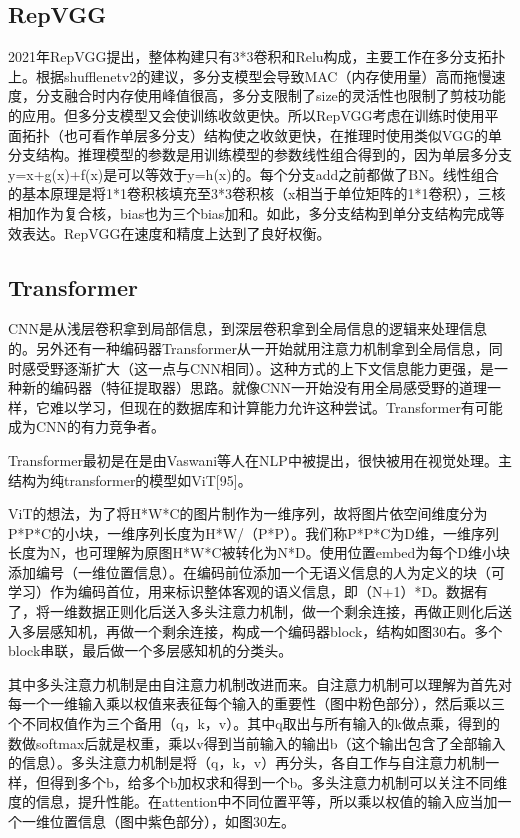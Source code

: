 \documentclass[15pt]{article}
\begin{document}
\subsection{RepVGG}
2021年RepVGG提出，整体构建只有3*3卷积和Relu构成，主要工作在多分支拓扑上。根据shufflenetv2的建议，多分支模型会导致MAC（内存使用量）高而拖慢速度，分支融合时内存使用峰值很高，多分支限制了size的灵活性也限制了剪枝功能的应用。但多分支模型又会使训练收敛更快。所以RepVGG考虑在训练时使用平面拓扑（也可看作单层多分支）结构使之收敛更快，在推理时使用类似VGG的单分支结构。推理模型的参数是用训练模型的参数线性组合得到的，因为单层多分支y=x+g(x)+f(x)是可以等效于y=h(x)的。每个分支add之前都做了BN。线性组合的基本原理是将1*1卷积核填充至3*3卷积核（x相当于单位矩阵的1*1卷积），三核相加作为复合核，bias也为三个bias加和。如此，多分支结构到单分支结构完成等效表达。RepVGG在速度和精度上达到了良好权衡。

\subsection{Transformer}
CNN是从浅层卷积拿到局部信息，到深层卷积拿到全局信息的逻辑来处理信息的。另外还有一种编码器Transformer从一开始就用注意力机制拿到全局信息，同时感受野逐渐扩大（这一点与CNN相同）。这种方式的上下文信息能力更强，是一种新的编码器（特征提取器）思路。就像CNN一开始没有用全局感受野的道理一样，它难以学习，但现在的数据库和计算能力允许这种尝试。Transformer有可能成为CNN的有力竞争者。

Transformer最初是在是由Vaswani等人在NLP中被提出，很快被用在视觉处理。主结构为纯transformer的模型如ViT[95]。

ViT的想法，为了将H*W*C的图片制作为一维序列，故将图片依空间维度分为P*P*C的小块，一维序列长度为H*W/（P*P）。我们称P*P*C为D维，一维序列长度为N，也可理解为原图H*W*C被转化为N*D。使用位置embed为每个D维小块添加编号（一维位置信息）。在编码前位添加一个无语义信息的人为定义的块（可学习）作为编码首位，用来标识整体客观的语义信息，即（N+1）*D。数据有了，将一维数据正则化后送入多头注意力机制，做一个剩余连接，再做正则化后送入多层感知机，再做一个剩余连接，构成一个编码器block，结构如图30右。多个block串联，最后做一个多层感知机的分类头。

其中多头注意力机制是由自注意力机制改进而来。自注意力机制可以理解为首先对每一个一维输入乘以权值来表征每个输入的重要性（图中粉色部分），然后乘以三个不同权值作为三个备用（q，k，v）。其中q取出与所有输入的k做点乘，得到的数做softmax后就是权重，乘以v得到当前输入的输出b（这个输出包含了全部输入的信息）。多头注意力机制是将（q，k，v）再分头，各自工作与自注意力机制一样，但得到多个b，给多个b加权求和得到一个b。多头注意力机制可以关注不同维度的信息，提升性能。在attention中不同位置平等，所以乘以权值的输入应当加一个一维位置信息（图中紫色部分），如图30左。
\end{document}
